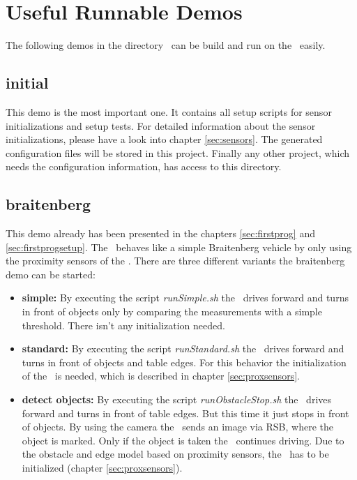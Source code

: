 \section{Useful Runnable Demos}

The following demos in the directory \demopathI\ can be build and run on the \amiro\ easily.

\subsection{initial}

This demo is the most important one. It contains all setup scripts for sensor initializations and setup tests. For detailed information about the sensor initializations, please have a look into chapter \ref{sec:sensors}. The generated configuration files will be stored in this project. Finally any other project, which needs the configuration information, has access to this directory.

\subsection{braitenberg}

This demo already has been presented in the chapters \ref{sec:firstprog} and \ref{sec:firstprogsetup}. The \amiro\ behaves like a simple Braitenberg vehicle by only using the proximity sensors of the \proxring. There are three different variants the braitenberg demo can be started:
\begin{itemize}
\item {\bf simple:} By executing the script {\it runSimple.sh} the \amiro\ drives forward and turns in front of objects only by comparing the measurements with a simple threshold. There isn't any initialization needed.
\item {\bf standard:} By executing the script {\it runStandard.sh} the \amiro\ drives forward and turns in front of objects and table edges. For this behavior the initialization of the \proxring\ is needed, which is described in chapter \ref{sec:proxsensors}.
\item {\bf detect objects:} By executing the script {\it runObstacleStop.sh} the \amiro\ drives forward and turns in front of table edges. But this time it just stops in front of objects. By using the camera the \amiro\ sends an image via RSB, where the object is marked. Only if the object is taken the \amiro\ continues driving. Due to the obstacle and edge model based on proximity sensors, the \proxring\ has to be initialized (chapter \ref{sec:proxsensors}).
\end{itemize}

